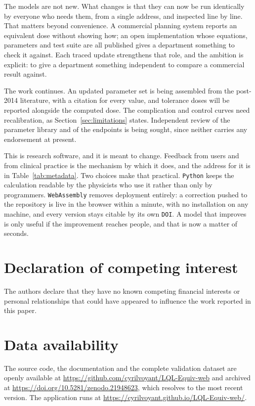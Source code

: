 \documentclass[preprint,12pt,number]{elsarticle}
\begin{document}
The models are not new. What changes is that they can now be run identically by everyone who needs them, from a single address, and inspected line by line. That matters beyond convenience. A commercial planning system reports an equivalent dose without showing how; an open implementation whose equations, parameters and test suite are all published gives a department something to check it against. Each traced update strengthens that role, and the ambition is explicit: to give a department something independent to compare a commercial result against.

The work continues. An updated parameter set is being assembled from the post-2014 literature, with a citation for every value, and tolerance doses will be reported alongside the computed dose. The complication and control curves need recalibration, as Section~\ref{sec:limitations} states. Independent review of the parameter library and of the endpoints is being sought, since neither carries any endorsement at present.

This is research software, and it is meant to change. Feedback from users and from clinical practice is the mechanism by which it does, and the address for it is in Table~\ref{tab:metadata}. Two choices make that practical. \texttt{Python} keeps the calculation readable by the physicists who use it rather than only by programmers. \texttt{WebAssembly} removes deployment entirely: a correction pushed to the repository is live in the browser within a minute, with no installation on any machine, and every version stays citable by its own \texttt{DOI}. A model that improves is only useful if the improvement reaches people, and that is now a matter of seconds.

\section*{Declaration of competing interest}
The authors declare that they have no known competing financial interests or personal relationships that could have appeared to influence the work reported
in this paper.

\section*{Data availability}
The source code, the documentation and the complete validation dataset are openly available at \url{https://github.com/cyrilvoyant/LQL-Equiv-web} and
archived at \url{https://doi.org/10.5281/zenodo.21948623}, which resolves to the most recent version. The application runs at \url{https://cyrilvoyant.github.io/LQL-Equiv-web/}.



\end{document}
